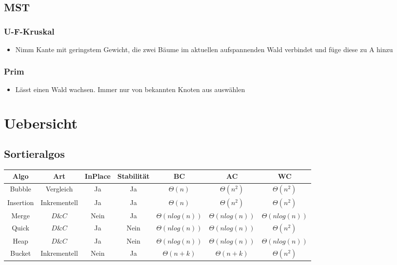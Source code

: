 \documentclass{article}
\begin{document}
\subsection{MST}
\subsubsection{U-F-Kruskal}
\begin{itemize}
\item Nimm Kante mit geringstem Gewicht, die zwei B{\"a}ume im aktuellen aufspannenden Wald verbindet und f{\"u}ge diese zu A hinzu
\end{itemize}

\subsubsection{Prim}
\begin{itemize}
\item L{\"a}sst einen Wald wachsen. Immer nur von bekannten Knoten aus ausw{\"a}hlen
\end{itemize}

\section{Uebersicht}
\subsection{Sortieralgos}
\begin{tabular}{c | c| c| c| c |c| c }
Algo & Art & InPlace & Stabilit{\"a}t & BC & AC & WC \\ \hline
Bubble& Vergleich& Ja & Ja & $\Theta(n)$ & $\Theta(n^2)$ & $\Theta(n^2)$\\
Insertion& Inkrementell & Ja & Ja & $\Theta(n)$ & $\Theta(n^2)$ & $\Theta(n^2)$ \\
Merge& $D\&C $ & Nein & Ja & $\Theta(nlog(n))$ & $\Theta(nlog(n))$ & $\Theta(nlog(n))$ \\
Quick& $D\&C $ & Ja & Nein & $\Theta(nlog(n))$ & $\Theta(nlog(n))$ & $\Theta(n^2)$ \\
Heap& $D\&C $ & Ja & Nein & $\Theta(nlog(n))$ & $\Theta(nlog(n))$ & $\Theta(nlog(n))$ \\
Bucket& Inkrementell & Nein & Ja & $\Theta(n+k)$ & $\Theta(n+k)$ & $\Theta(n^2)$ \\

\end{tabular}
\end{document}
